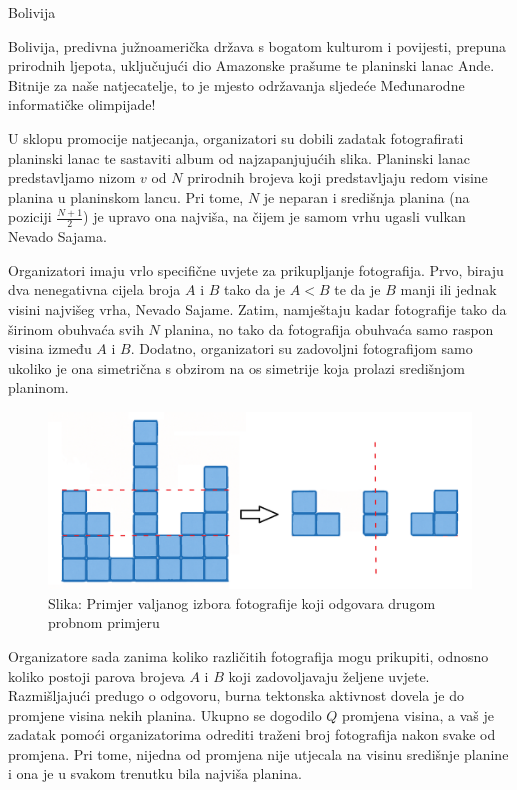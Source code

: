 \begin{statement}[
  problempoints=100,
  timelimit=1 sekunda,
  memorylimit=512 MiB,
]{Bolivija}

Bolivija, predivna južnoamerička država s bogatom kulturom i povijesti, 
prepuna prirodnih ljepota, uključujući dio Amazonske prašume te planinski lanac Ande. 
Bitnije za naše natjecatelje, to je mjesto održavanja sljedeće Međunarodne informatičke 
olimpijade! 

U sklopu promocije natjecanja, organizatori su dobili zadatak 
fotografirati planinski lanac te sastaviti album od najzapanjujućih slika.
Planinski lanac predstavljamo nizom $v$ od $N$ prirodnih brojeva koji 
predstavljaju redom visine planina u planinskom lancu. 
Pri tome, $N$ je neparan i središnja planina (na poziciji $\frac{N+1}{2}$) je upravo ona najviša, 
na čijem je samom vrhu ugasli vulkan Nevado Sajama. 

Organizatori imaju vrlo specifične uvjete za prikupljanje fotografija. 
Prvo, biraju dva nenegativna cijela broja $A$ i $B$ tako da je $A < B$ te da je $B$ manji ili 
jednak visini najvišeg vrha, Nevado Sajame. 
Zatim, namještaju kadar fotografije tako da širinom obuhvaća svih $N$ planina, no tako 
da fotografija obuhvaća samo raspon visina između $A$ i $B$. 
Dodatno, organizatori su zadovoljni fotografijom samo ukoliko je ona simetrična s 
obzirom na os simetrije koja prolazi središnjom planinom. 

\begin{figure}[!h]
      \centering
      \includegraphics[width=\linewidth]{pic/planine.png}
      \caption*{Slika: Primjer valjanog izbora fotografije koji odgovara drugom probnom primjeru}
\end{figure}

Organizatore sada zanima koliko različitih fotografija mogu prikupiti, odnosno 
koliko postoji parova brojeva $A$ i $B$ koji zadovoljavaju željene uvjete. 
Razmišljajući predugo o odgovoru, burna tektonska aktivnost dovela je do promjene 
visina nekih planina. Ukupno se dogodilo $Q$ promjena visina, a vaš je zadatak 
pomoći organizatorima odrediti traženi broj fotografija nakon svake od promjena. 
Pri tome, nijedna od promjena nije utjecala na visinu središnje planine i ona je 
u svakom trenutku bila najviša planina. 


\end{statement}
